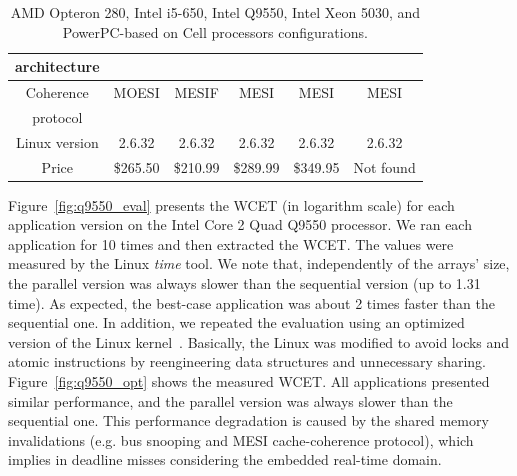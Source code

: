\documentclass[conference]{IEEEtran}
\begin{document}
\begin{savenotes}
\begin{table}
\begin{center}
{\begin{tabular}{|c|c|c|c|c|c|}
architecture 	&		   & 		  & 	&	  &	   \\
\hline
Coherence & MOESI & MESIF & MESI & MESI & MESI \\
protocol  &		  &		  &		 &		&	   \\
\hline
Linux version & 2.6.32 & 2.6.32 & 2.6.32 & 2.6.32 & 2.6.32 \\
\hline
Price\footnotemark[1] & \$265.50 & \$210.99 & \$289.99 & \$349.95 & Not found \\
\hline
\end{tabular}
}
\end{center}
\caption{AMD Opteron 280, Intel i5-650, Intel Q9550, Intel Xeon 5030, and PowerPC-based on Cell processors configurations.}
\label{tab:processors}	
\end{table}
\end{savenotes}
\addtocounter{footnote}{1}

Figure~\ref{fig:q9550_eval} presents the WCET (in logarithm scale) for each application version on the Intel Core 2 Quad Q9550 processor. We ran each application for 10 times and then extracted the WCET. The values were measured by the Linux \emph{time} tool. We note that, independently of the arrays' size, the parallel version was always slower than the sequential version (up to 1.31 time). As expected, the best-case application was about 2 times faster than the sequential one. In addition, we repeated the evaluation using an optimized version of the Linux kernel~\cite{BoydWickizer:10}. Basically, the Linux was modified to avoid locks and atomic instructions by reengineering data structures and unnecessary sharing. Figure~\ref{fig:q9550_opt} shows the measured WCET. All applications presented similar performance, and the parallel version was always slower than the sequential one. This performance degradation is caused by the shared memory invalidations (e.g. bus snooping and MESI cache-coherence protocol), which implies in deadline misses considering the embedded real-time domain.
\end{document}

